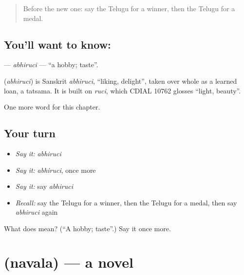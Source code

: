 \label{lesson:TE-C189-abhiruci}



\begin{quote}
Before the new one: say the Telugu for a winner, then the Telugu for a medal.
\end{quote}

\subsection*{You'll want to know: }
\textbf{} — \emph{abhiruci} — \textquotedblleft{}a hobby; taste\textquotedblright{}.

\begin{cousinweb}
\textbf{} (\emph{abhiruci}) is Sanskrit \emph{abhiruci}, \textquotedblleft{}liking, delight\textquotedblright{}, taken over whole as a learned loan, a tatsama. It is built on \emph{ruci}, which CDIAL 10762 glosses \textquotedblleft{}light, beauty\textquotedblright{}.
\end{cousinweb}

\begin{grammarlens}[title={What you've built}]
One more word for this chapter.
\end{grammarlens}

\subsection*{Your turn}
\begin{itemize}
\raggedright
  \item \emph{Say it:} \emph{abhiruci}
  \item \emph{Say it:} \emph{abhiruci}, once more
  \item \emph{Say it:} say \emph{abhiruci}
  \item \emph{Recall:} say the Telugu for a winner, then the Telugu for a medal, then say \emph{abhiruci} again
\end{itemize}

\begin{tcolorbox}[breakable,colback=teal!4,colframe=teal!35!black,title={Before you move on}]
What does  mean? (\textquotedblleft{}A hobby; taste\textquotedblright{}.) Say it once more.
\end{tcolorbox}
\section[\texorpdfstring{\te{నవల} (navala)}{నవల (navala)}]{ (navala) — a novel}

